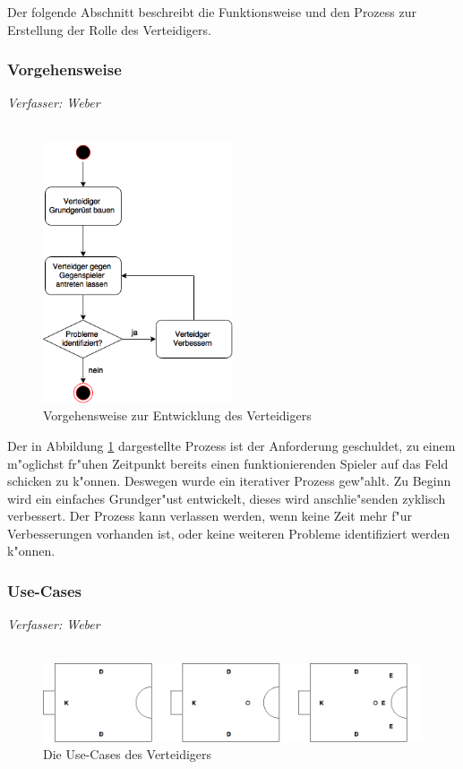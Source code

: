 Der folgende Abschnitt beschreibt die Funktionsweise und den Prozess zur Erstellung der Rolle des Verteidigers.

\subsubsection{Vorgehensweise}
\textit{Verfasser: Weber}\\
\\
\begin{figure}[H]
	\centering
	\includegraphics[width=0.5\textwidth]{Grafiken/KI/defender/vorgehensweise.png}
	\caption{Vorgehensweise zur Entwicklung des Verteidigers}
	\label{Vorgehensweise-Verteidigers}
\end{figure}
Der in Abbildung \ref{Vorgehensweise-Verteidigers} dargestellte Prozess ist der Anforderung geschuldet, zu einem m"oglichst fr"uhen Zeitpunkt bereits einen funktionierenden Spieler auf das Feld schicken zu k"onnen. Deswegen wurde ein iterativer Prozess gew"ahlt. Zu Beginn wird ein einfaches Grundger"ust entwickelt, dieses wird anschlie"senden zyklisch verbessert. Der Prozess kann verlassen werden, wenn keine Zeit mehr f"ur Verbesserungen vorhanden ist, oder keine weiteren Probleme identifiziert werden k"onnen.

\subsubsection{Use-Cases}
\textit{Verfasser: Weber}\\
\\
\begin{figure}[H]
	\centering
	\includegraphics[width=\ScaleIfNeeded]{Grafiken/KI/defender/useCases.png}
	\caption{Die Use-Cases des Verteidigers}
	\label{Usecases-Verteidigers}
\end{figure}

